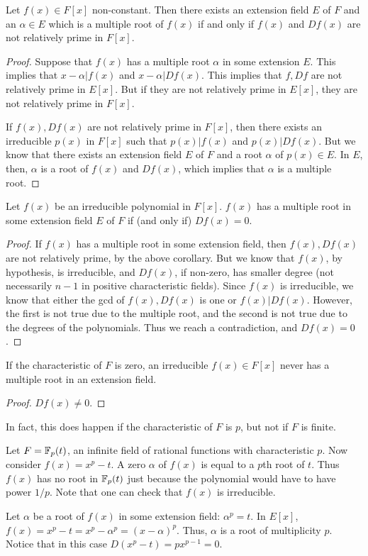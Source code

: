 \documentclass{../mathnotes}
\begin{document}
\begin{cor}
    Let $f(x)\in F[x]$ non-constant. Then there exists an extension field $E$ of $F$ and an $\alpha\in E$ which is a multiple root of $f(x)$
    if and only if $f(x)$ and $Df(x)$ are not relatively prime in $F[x]$.
\end{cor}
\begin{proof}
    Suppose that $f(x)$ has a multiple root $\alpha$ in some extension $E$. This implies that $x-\alpha|f(x)$ and $x-\alpha|Df(x)$.
    This implies that $f,Df$ are not relatively prime in $E[x]$. But if they are not relatively prime in $E[x]$, they are not relatively
    prime in $F[x]$.

    If $f(x),Df(x)$ are not relatively prime in $F[x]$, then there exists an irreducible $p(x)$ in $F[x]$ such that $p(x)|f(x)$ and
    $p(x)|Df(x)$. But we know that there exists an extension field $E$ of $F$ and a root $\alpha$ of $p(x)\in E$. In $E$, then,
    $\alpha$ is a root of $f(x)$ and $Df(x)$, which implies that $\alpha$ is a multiple root.
\end{proof}

\begin{cor}
    Let $f(x)$ be an irreducible polynomial in $F[x]$. $f(x)$ has a multiple root in some extension field $E$ of $F$ if (and only if)
    $Df(x)=0$.
\end{cor}
\begin{proof}
    If $f(x)$ has a multiple root in some extension field, then $f(x),Df(x)$ are not relatively prime, by the above corollary.
    But we know that $f(x)$, by hypothesis, is irreducible, and $Df(x)$, if non-zero, has smaller degree (not necessarily $n-1$ in
    positive characteristic fields). Since $f(x)$ is irreducible, we know that either the gcd of $f(x),Df(x)$ is one or $f(x)|Df(x)$.
    However, the first is not true due to the multiple root, and the second is not true due to the degrees of the polynomials.
    Thus we reach a contradiction, and $Df(x)=0$.
\end{proof}

\begin{cor}
    If the characteristic of $F$ is zero, an irreducible $f(x)\in F[x]$ never has a multiple root in an extension field.
\end{cor}
\begin{proof}
    $Df(x)\neq 0$.
\end{proof}

In fact, this does happen if the characteristic of $F$ is $p$, but not if $F$ is finite.
\begin{exmp}
    Let $F=\mathbb{F}_p(t)$, an infinite field of rational functions with characteristic $p$. Now consider $f(x)=x^p-t$.
    A zero $\alpha$ of $f(x)$ is equal to a $p$th root of $t$. Thus $f(x)$ has no root in $\mathbb{F}_p(t)$ just because
    the polynomial would have to have power $1/p$. Note that one can check that $f(x)$ is irreducible.

    Let $\alpha$ be a root of $f(x)$ in some extension field: $\alpha^p=t$. In $E[x]$, $f(x)=x^p-t=x^p-\alpha^p=(x-\alpha)^p$.
    Thus, $\alpha$ is a root of multiplicity $p$.
    Notice that in this case $D(x^p-t)=px^{p-1}=0$.
\end{exmp}
\end{document}
